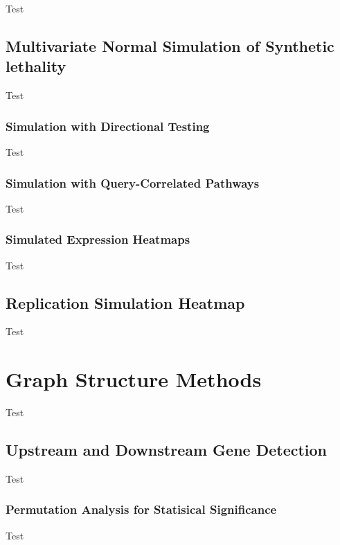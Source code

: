 Test

\subsection{Multivariate Normal Simulation of Synthetic lethality}
Test

\subsubsection{Simulation with Directional Testing}
Test

\subsubsection{Simulation with Query-Correlated Pathways}
Test


\subsubsection{Simulated Expression Heatmaps}
Test

\subsection{Replication Simulation Heatmap}
Test

\section{Graph Structure Methods}
Test

\subsection{Upstream and Downstream Gene Detection} \label{methods:pathway_str}
Test

\subsubsection{Permutation Analysis for Statisical Significance} \label{methods:network_permutation}
Test

